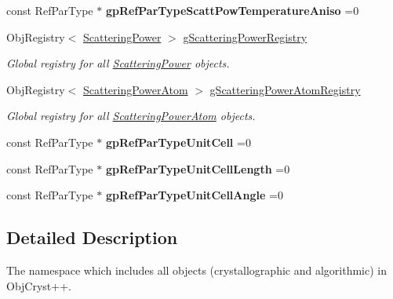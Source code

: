 \begin{DoxyCompactItemize}
const Ref\+Par\+Type $\ast$ {\bfseries gp\+Ref\+Par\+Type\+Scatt\+Pow\+Temperature\+Aniso} =0
\item 
\mbox{\label{namespace_obj_cryst_aa9595035adc64da0a4f98423bf5e6892}} 
Obj\+Registry$<$ \mbox{\hyperlink{class_obj_cryst_1_1_scattering_power}{Scattering\+Power}} $>$ \mbox{\hyperlink{namespace_obj_cryst_aa9595035adc64da0a4f98423bf5e6892}{g\+Scattering\+Power\+Registry}}
\begin{DoxyCompactList}\small\item\em Global registry for all \mbox{\hyperlink{class_obj_cryst_1_1_scattering_power}{Scattering\+Power}} objects. \end{DoxyCompactList}\item 
\mbox{\label{namespace_obj_cryst_af959ee7b087e59dce5acf3b688b4c47f}} 
Obj\+Registry$<$ \mbox{\hyperlink{class_obj_cryst_1_1_scattering_power_atom}{Scattering\+Power\+Atom}} $>$ \mbox{\hyperlink{namespace_obj_cryst_af959ee7b087e59dce5acf3b688b4c47f}{g\+Scattering\+Power\+Atom\+Registry}}
\begin{DoxyCompactList}\small\item\em Global registry for all \mbox{\hyperlink{class_obj_cryst_1_1_scattering_power_atom}{Scattering\+Power\+Atom}} objects. \end{DoxyCompactList}\item 
\mbox{\label{namespace_obj_cryst_a74db362ee69ea7ceb1b1f6364eace619}} 
const Ref\+Par\+Type $\ast$ {\bfseries gp\+Ref\+Par\+Type\+Unit\+Cell} =0
\item 
\mbox{\label{namespace_obj_cryst_a1d7f8cabae50068614ae7ef71aee42da}} 
const Ref\+Par\+Type $\ast$ {\bfseries gp\+Ref\+Par\+Type\+Unit\+Cell\+Length} =0
\item 
\mbox{\label{namespace_obj_cryst_a9c37be8fc74a5ad4149030c5c7732415}} 
const Ref\+Par\+Type $\ast$ {\bfseries gp\+Ref\+Par\+Type\+Unit\+Cell\+Angle} =0
\end{DoxyCompactItemize}


\subsection{Detailed Description}
The namespace which includes all objects (crystallographic and algorithmic) in Obj\+Cryst++.

